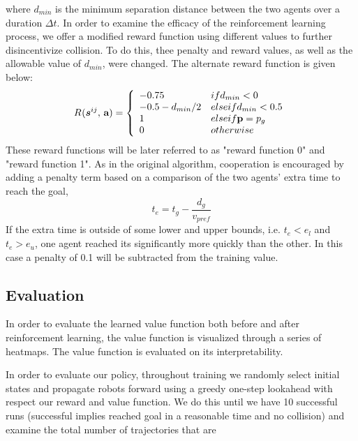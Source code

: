\documentclass[conference]{IEEEtran}
\begin{document}
where $d_{min}$ is the minimum separation distance between
the two agents over a duration $\Delta t$. In order to examine the efficacy of the reinforcement learning process, we offer a modified reward function using different values to further disincentivize collision. To do this, thee penalty and reward values, as well as the allowable value of $d_{min}$, were changed. The alternate reward function is given below:
\begin{equation} 
\Reward{}(\state{ij}{}, \, \textbf{a})=
\left\{
    \begin{array}{ll}
        -0.75 & \mbox{if } d_{min}<0  \\
        -0.5 - d_{min}/2 & \mbox{else if } d_{min}<0.5\\
        1 & \mbox{else if }  \textbf{p}=p_{g} \\
        0 & \mbox{otherwise }\\
    \end{array}
\right. 
\label{eqn:reward2}
\end{equation}
These reward functions will be later referred to as "reward function 0" and "reward function 1". 
As in the original algorithm, cooperation is encouraged by adding a penalty term based on a comparison of the two agents’ extra time to reach the goal,
\begin{equation} 
t_{e} = t_{g}- \frac{d_{g}}{v_{pref}} 
\end{equation}
If the extra time is outside of some lower and upper bounds, i.e. $t_{e} < e_{l}$ and $t_{e} > e_{u}$, one agent reached its significantly more quickly than the other. In this case a penalty of 0.1 will be subtracted from
the training value. 

\subsection{Evaluation}

In order to evaluate the learned value function both before and after reinforcement learning, the value function is visualized through a series of heatmaps. The value function is evaluated on its interpretability. 

In order to evaluate our policy, throughout training we randomly select initial states and propagate robots forward using a greedy one-step lookahead with respect our reward and value function. We do this until we have 10 successful runs (successful implies reached goal in a reasonable time and no collision) and examine the total number of trajectories that are
\end{document}
